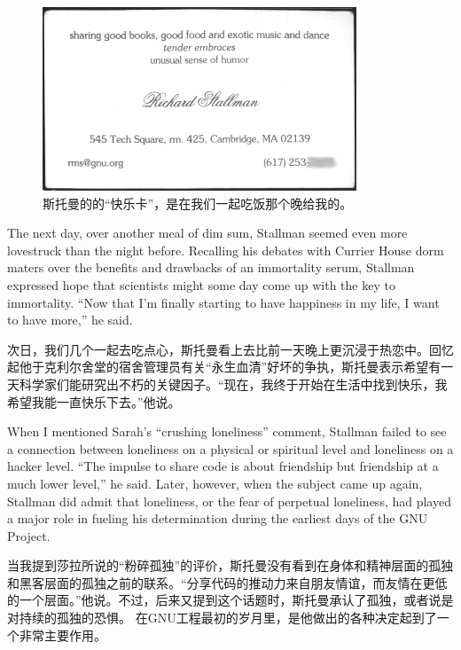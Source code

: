 \ifdefined\chs
\begin{figure}[ht] \centering
  \includegraphics{pleasurecard}
  \caption{斯托曼的的“快乐卡”，是在我们一起吃饭那个晚给我的。}
\end{figure}

\fi


\ifdefined\eng
The next day, over another meal of dim sum, Stallman seemed even more lovestruck than the night before. Recalling his debates with Currier House dorm maters over the benefits and drawbacks of an immortality serum, Stallman expressed hope that scientists might some day come up with the key to immortality. ``Now that I'm finally starting to have happiness in my life, I want to have more,'' he said.
\fi

\ifdefined\chs
次日，我们几个一起去吃点心，斯托曼看上去比前一天晚上更沉浸于热恋中。回忆起他于克利尔舍堂的宿舍管理员有关“永生血清”好坏的争执，斯托曼表示希望有一天科学家们能研究出不朽的关键因子。“现在，我终于开始在生活中找到快乐，我希望我能一直快乐下去。”他说。
\fi

\ifdefined\eng
When I mentioned Sarah's ``crushing loneliness'' comment, Stallman failed to see a connection between loneliness on a physical or spiritual level and loneliness on a hacker level. ``The impulse to share code is about friendship but friendship at a much lower level,'' he said. Later, however, when the subject came up again, Stallman did admit that loneliness, or the fear of perpetual loneliness, %
had played a major role in fueling his determination during the earliest days of the GNU Project.
\fi

\ifdefined\chs
当我提到莎拉所说的“粉碎孤独”的评价，斯托曼没有看到在身体和精神层面的孤独和黑客层面的孤独之前的联系。“分享代码的推动力来自朋友情谊，而友情在更低的一个层面。”他说。不过，后来又提到这个话题时，斯托曼承认了孤独，或者说是对持续的孤独的恐惧。%
在GNU工程最初的岁月里，是他做出的各种决定起到了一个非常主要作用。
\fi

